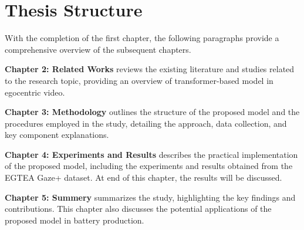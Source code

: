 \section{Thesis Structure}
\label{sec:thesis structure}
With the completion of the first chapter, the following paragraphs provide a comprehensive overview of the subsequent chapters.

\textbf{Chapter 2: Related Works} reviews the existing literature and studies related to the research topic, providing an overview of transformer-based model in egocentric video.

\textbf{Chapter 3: Methodology} outlines the structure of the proposed model and the procedures employed in the study, detailing the approach, data collection, and key component explanations.

\textbf{Chapter 4: Experiments and Results} describes the practical implementation of the proposed model, including the experiments and results obtained from the EGTEA Gaze+ dataset. At end of this chapter, the results will be discussed.

\textbf{Chapter 5: Summery} summarizes the study, highlighting the key findings and contributions. This chapter also discusses the potential applications of the proposed model in battery production.